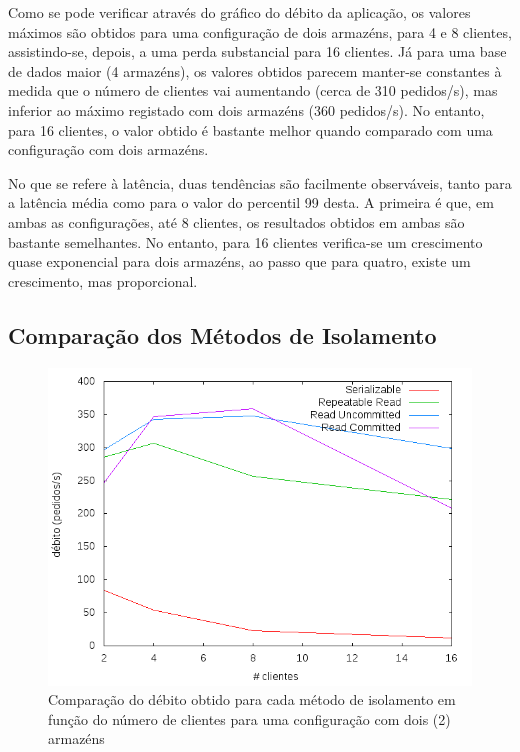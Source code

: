 Como se pode verificar através do gráfico do débito da aplicação, os valores máximos são obtidos para uma configuração de dois armazéns, para 4 e 8 clientes, assistindo-se, depois, a uma perda substancial para 16 clientes.
Já para uma base de dados maior (4 armazéns), os valores obtidos parecem manter-se constantes à medida que o número de clientes vai aumentando (cerca de 310 pedidos/s), mas inferior ao máximo registado com dois armazéns (360 pedidos/s).
No entanto, para 16 clientes, o valor obtido é bastante melhor quando comparado com uma configuração com dois armazéns.

No que se refere à latência, duas tendências são facilmente observáveis, tanto para a latência média como para o valor do percentil 99 desta.
A primeira é que, em ambas as configurações, até 8 clientes, os resultados obtidos em ambas são bastante semelhantes.
No entanto, para 16 clientes verifica-se um crescimento quase exponencial para dois armazéns, ao passo que para quatro, existe um crescimento, mas proporcional.

\newpage

\subsection{Comparação dos Métodos de Isolamento}

\begin{figure}[!h]
\centering
\includegraphics[scale=.5]{img/questao-1/diff-deb-2-arm}
\caption{Comparação do débito obtido para cada método de isolamento em função do número de clientes para uma configuração com dois (2) armazéns}
\end{figure}

